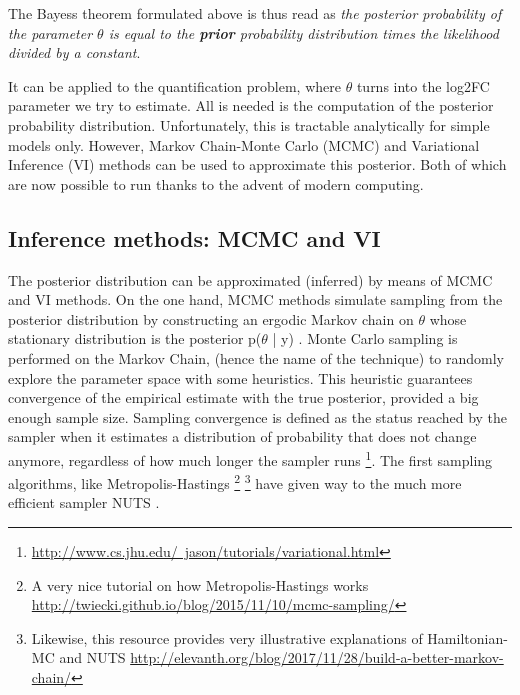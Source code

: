 The Bayes\textquotesingle s theorem formulated above is thus read as \textit{the posterior probability of the parameter $\theta$ is equal to the \textbf{prior} probability distribution times the likelihood divided by a constant}.

It can be applied to the quantification problem, where $\theta$ turns into the log2FC parameter we try to estimate. All is needed is the computation of the posterior probability distribution. Unfortunately, this is tractable analytically for simple models only. However, Markov Chain-Monte Carlo (\ac{MCMC}) and Variational Inference (\ac{VI}) methods can be used to approximate this posterior. Both of which are now possible to run thanks to the advent of modern computing.

\subsection{Inference methods: \ac{MCMC} and \ac{VI}}

The posterior distribution can be approximated (inferred) by means of \ac{MCMC} and \ac{VI} methods. On the one hand, \ac{MCMC} methods simulate sampling from the posterior distribution by constructing an ergodic Markov chain on $\theta$ whose stationary distribution is the posterior p($\theta$ | y) \cite{Blei2017}. Monte Carlo sampling is performed on the Markov Chain, (hence the name of the technique) to randomly explore the parameter space with some heuristics. This heuristic guarantees convergence of the empirical estimate with the true posterior, provided a big enough sample size. Sampling convergence is defined as the status reached by the sampler when it estimates a distribution of probability that does not change anymore, regardless of how much longer the sampler runs \cite{Tran2018} \footnote{\href{http://www.cs.jhu.edu/~jason/tutorials/variational.html}{http://www.cs.jhu.edu/~jason/tutorials/variational.html}}. The first sampling algorithms, like Metropolis-Hastings \cite{Chib1995} \footnote{A very nice tutorial on how Metropolis-Hastings works \href{http://twiecki.github.io/blog/2015/11/10/mcmc-sampling/}{http://twiecki.github.io/blog/2015/11/10/mcmc-sampling/}} \footnote{Likewise, this resource provides very illustrative explanations of Hamiltonian-MC and NUTS \href{http://elevanth.org/blog/2017/11/28/build-a-better-markov-chain/}{http://elevanth.org/blog/2017/11/28/build-a-better-markov-chain/}} have given way to the much more efficient sampler \ac{NUTS} \cite{Hoffman2011}.

